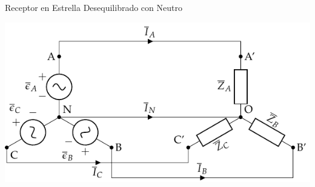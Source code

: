 \documentclass[aspectratio=169, usenames,svgnames,dvipsnames]{beamer}
\begin{document}
\begin{frame}[label={sec:org53212b1}]{Receptor en Estrella Desequilibrado con Neutro}
\begin{center}
\includegraphics[width=.9\linewidth]{../figs/EstrellaDesequilibrado.pdf}
\end{center}
\end{frame}
\end{document}
